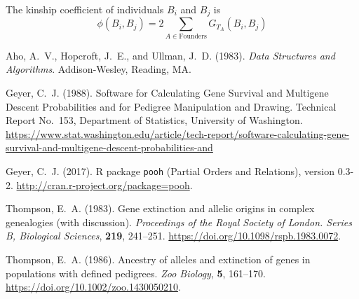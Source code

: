 \documentclass[11pt]{article}
\begin{document}
The kinship coefficient of individuals $B_i$ and $B_j$ is
\begin{equation} \label{eq:kinship}
   \phi(B_i, B_j) = 2 \sum_{A \in \text{Founders}} G_{T_A}(B_i, B_j)
\end{equation}

\begin{thebibliography}{}

Aho, A.~V., Hopcroft, J.~E., and Ullman, J.~D. (1983).
\newblock \emph{Data Structures and Algorithms}.
\newblock Addison-Wesley, Reading, MA.

Geyer, C.~J. (1988).
\newblock Software for Calculating Gene Survival and Multigene Descent
    Probabilities and for Pedigree Manipulation and Drawing.
\newblock Technical Report No.~153, Department of Statistics,
    University of Washington.
\newblock \url{https://www.stat.washington.edu/article/tech-report/software-calculating-gene-survival-and-multigene-descent-probabilities-and}

Geyer, C.~J. (2017).
\newblock R package \texttt{pooh} (Partial Orders and Relations), version 0.3-2.
\newblock \url{http://cran.r-project.org/package=pooh}.

Thompson, E.~A. (1983).
\newblock Gene extinction and allelic origins in complex genealogies
    (with discussion).
\newblock \emph{Proceedings of the Royal Society of London. Series B,
    Biological Sciences}, \textbf{219}, 241--251.
\newblock \url{https://doi.org/10.1098/rspb.1983.0072}.

Thompson, E.~A. (1986).
\newblock Ancestry of alleles and extinction of genes in populations with
    defined pedigrees.
\newblock \emph{Zoo Biology}, \textbf{5}, 161--170.
\newblock \url{https://doi.org/10.1002/zoo.1430050210}.

\end{thebibliography}
\end{document}
